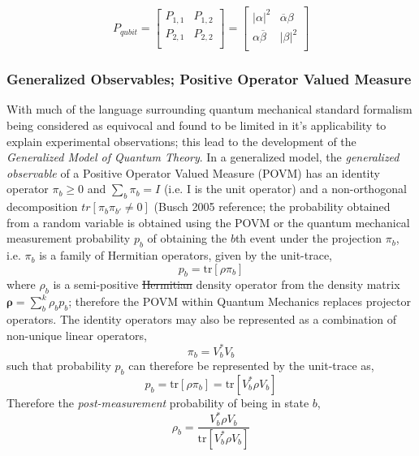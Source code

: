 \documentclass[7pt]{article}
\begin{document}
$$
P_{qubit} =
\left[
\begin{array}{cc}
P_{1,1} & P_{1,2}  \\
P_{2,1}  & P_{2,2}  \\
\end{array}
\right]
=
\left[
\begin{array}{cc}
|\alpha|^2 & \overline{\alpha} \beta \\
\alpha \overline{\beta}  & |\beta|^2   \\
\end{array}
\right]
$$
\subsubsection{Generalized Observables; Positive Operator Valued Measure}
With much of the language surrounding quantum mechanical standard formalism being considered as equivocal and found to be limited in it's applicability to explain experimental observations; this lead to the development of the \emph{Generalized Model of Quantum Theory}. In a generalized model, the \emph{generalized observable} of a Positive Operator Valued Measure (POVM) has an identity operator $\pi_b \geq 0$ and $\sum_{b} \pi_b = I$ (i.e. I is the unit operator) and a non-orthogonal decomposition $tr [\pi_b \pi_{b'} \neq 0]$ (Busch 2005 reference; the probability obtained from a random variable is obtained using the POVM or the quantum mechanical measurement probability $p_b$ of obtaining the $b$th event under the projection $\pi_{b}$, i.e. $\pi_b$ is a family of Hermitian operators, given by the unit-trace,
\begin{equation}
p_b = \text{tr}[ \rho \pi_b]
\end{equation}
where $\rho_b$  is a semi-positive \st{Hermitian} density operator from the density matrix $\mathbf{\rho} = \sum_b^k \rho_b p_b$; therefore the POVM within Quantum Mechanics replaces projector operators. The identity operators may also be represented as a combination of non-unique linear operators,
\begin{equation}
\pi_b = V_b^{*} V_b
\end{equation}
such that probability $p_b$ can therefore be represented by the unit-trace as,
\begin{equation}
p_b = \text{tr}[ \rho \pi_b] = \text{tr}[ V_b^{*} \rho V_b]
\end{equation}
Therefore the \emph{post-measurement} probability of being in state $b$,
\begin{equation}
\rho_b = \dfrac{V_b^{*} \rho V_b}{\text{tr}[ V_b^{*} \rho V_b]}
\end{equation}
\end{document}
